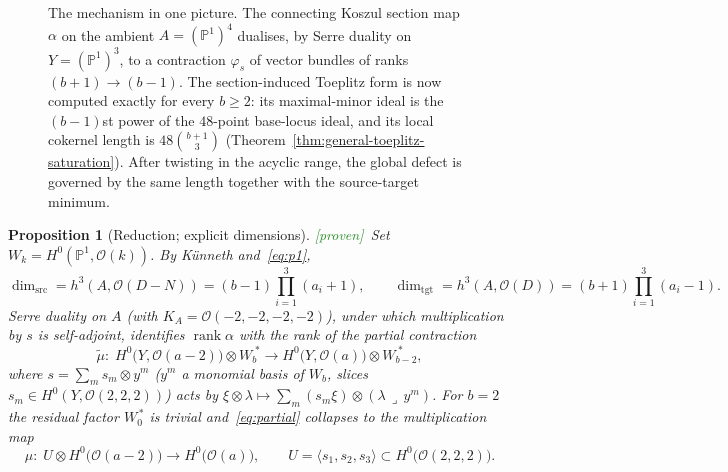 \documentclass[11pt]{article}
\theoremstyle{plain}
\newtheorem{proposition}[theorem]{Proposition}
\theoremstyle{definition}
\theoremstyle{remark}
\newcommand{\Proven}{\textcolor{ForestGreen}{\textsf{[proven]}}}
\newcommand{\PP}{\mathbb{P}}
\newcommand{\cO}{\mathcal{O}}
\newcommand{\cZ}{\mathcal{Z}}
\newcommand{\rank}{\operatorname{rank}}
\begin{document}
\begin{figure}[t]
\centering
{}
\caption{The mechanism in one picture. The connecting Koszul section map $\alpha$ on the ambient $A=(\PP^1)^4$ dualises, by Serre duality on $Y=(\PP^1)^3$, to a contraction $\varphi_s$ of vector bundles of ranks $(b{+}1)\to(b{-}1)$. The section-induced Toeplitz form is now computed exactly for every $b\ge2$: its maximal-minor ideal is the $(b{-}1)$st power of the $48$-point base-locus ideal, and its local cokernel length is $48\binom{b+1}{3}$ (Theorem~\ref{thm:general-toeplitz-saturation}). After twisting in the acyclic range, the global defect is governed by the same length together with the source-target minimum.}
\label{fig:mechanism}
\end{figure}

\begin{proposition}[Reduction; explicit dimensions]\label{prop:reduction}
\Proven\ Set $W_k=H^0(\PP^1,\cO(k))$. By K\"unneth and~\eqref{eq:p1},
\[
\dim_{\mathrm{src}}=h^3(A,\cO(D-N))=(b-1)\prod_{i=1}^3(a_i+1),
\qquad
\dim_{\mathrm{tgt}}=h^3(A,\cO(D))=(b+1)\prod_{i=1}^3(a_i-1).
\]
Serre duality on $A$ (with $K_A=\cO(-2,-2,-2,-2)$), under which multiplication by $s$ is self-adjoint, identifies $\rank\alpha$ with the rank of the partial contraction
\begin{equation}\label{eq:partial}
\widetilde{\mu}:\;H^0\big(Y,\cO(a-2)\big)\otimes W_b^{\;*}\longrightarrow H^0\big(Y,\cO(a)\big)\otimes W_{b-2}^{\;*},
\end{equation}
where $s=\sum_m s_m\otimes y^m$ ($y^m$ a monomial basis of $W_b$, slices $s_m\in H^0(Y,\cO(2,2,2))$) acts by $\xi\otimes\lambda\mapsto\sum_m (s_m\xi)\otimes(\lambda\,\lrcorner\, y^m)$. For $b=2$ the residual factor $W_0^{\,*}$ is trivial and~\eqref{eq:partial} collapses to the multiplication map
\begin{equation}\label{eq:mult}
\mu:\;U\otimes H^0\big(\cO(a-2)\big)\longrightarrow H^0\big(\cO(a)\big),
\qquad U=\langle s_1,s_2,s_3\rangle\subset H^0\big(\cO(2,2,2)\big).
\end{equation}
\end{proposition}
\end{document}
